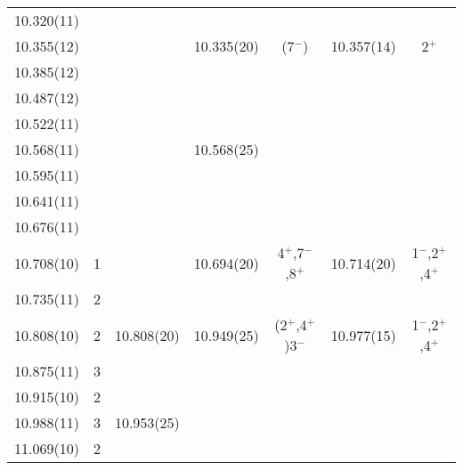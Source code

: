 \begin{center}
\begin{longtable}{cc c cc cc}
  10.320(11)    &       &                   &                   &                   &                   &                   \\
  10.355(12)    &       &                   &     10.335(20)    &   (7$^-$)         &   10.357(14)      & 2$^+$             \\
  10.385(12)    &       &                   &                   &                   &                   &                   \\
  10.487(12)    &       &                   &                   &                   &                   &                   \\
  10.522(11)    &       &                   &                   &                   &                   &                   \\
  10.568(11)    &       &                   &    10.568(25)     &                   &                   &                   \\
  10.595(11)    &       &                   &                   &                   &                   &                   \\
 10.641(11)     &       &                   &                   &                   &                   &                   \\
 10.676(11)     &       &                   &                   &                   &                   &                   \\
 10.708(10)     &   1   &                   &     10.694(20)    &4$^+$,7$^-$,8$^+$  &    10.714(20)     & 1$^-$,2$^+$,4$^+$ \\
 10.735(11)     &   2   &                   &                   &                   &                   &                   \\
 10.808(10)     &   2   &     10.808(20)    &     10.949(25)    &(2$^+$,4$^+$)3$^-$ &   10.977(15)      &1$^-$,2$^+$,4$^+$  \\
 10.875(11)     &   3   &                   &                   &                   &                   &                   \\
 10.915(10)     &   2   &                   &                   &                   &                   &                   \\
10.988(11)      &   3   &     10.953(25)    &                   &                   &                   &                   \\
 11.069(10)     &   2   &                   &                   &                   &                   &                   \\

\end{longtable}
\end{center}
